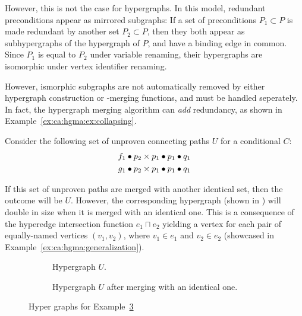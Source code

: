 \documentclass[../Master.tex]{subfiles}
\providecommand{\master}{..}
\begin{document}
However, this is not the case for hypergraphs. In this model, redundant preconditions appear as mirrored subgraphs: If a set of preconditions $P_1 \subset P$ is made redundant by another set $P_2 \subset P$, then they both appear as subhypergraphs of the hypergraph of $P$, and have a binding edge in common. Since $P_1$ is equal to $P_2$ under variable renaming, their hypergraphs are isomorphic under vertex identifier renaming. 

However, ismorphic subgraphs are not automatically removed by either hypergraph construction or -merging functions, and must be handled seperately. In fact, the hypergraph merging algorithm can \textit{add} redundancy, as shown in Example~\ref{ex:ca:hgma:ex:collapsing}.


\begin{example}\label{ex:ca:hgma:ex:collapsing}
    
    Consider the following set of unproven connecting paths $U$ for a conditional $C$:
    \begin{align*}
        f_1 \bullet p_2 \times p_1 \bullet p_1 \bullet q_1 \\
        g_1 \bullet p_2 \times p_1 \bullet p_1 \bullet q_1
    \end{align*}

    If this set of unproven paths are merged with another identical set, then the outcome will be $U$. However, the corresponding hypergraph (shown in ) will double in size when it is merged with an identical one. This is a consequence of the hyperedge intersection function $e_1 \sqcap e_2$ yielding a vertex for each pair of equally-named vertices $\left(v_1, v_2\right)$, where $v_1 \in e_1$ and $v_2 \in e_2$ (showcased in Example~\ref{ex:ca:hgma:generalization}).

	\begin{figure}
        \centering
        \hfill
        \begin{subfigure}[b]{0.4\textwidth}
            \centering
            \resizebox{0.7\linewidth}{!}{}
            \caption{Hypergraph $U$.}
            \label{fig:ex:ca:hgma:ex:isomorphic}
        \end{subfigure}%
        \hfill%
        \begin{subfigure}[b]{0.4\textwidth}
            \centering
            \resizebox{0.75\linewidth}{!}{}
            \caption{Hypergraph $U$ after merging with an identical one.}
            \label{fig:ex:ca:hgma:ex:isomorphicReduced}
        \end{subfigure}
		\caption{Hyper graphs for Example~\ref{fig:ex:ca:hgma:ex:collapsing}}\label{fig:ex:ca:hgma:ex:collapsing}
        \hfill
    \end{figure}
\end{example}
\end{document}
